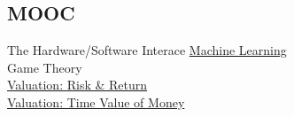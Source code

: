 \documentclass[]{deedy}
\begin{document}
\begin{minipage}[t]{0.25\textwidth}
\begin{flushleft}
\subsection{MOOC}
The Hardware/Software Interace
\vspace{1pt}
\href{https://www.coursera.org/account/accomplishments/certificate/7V2KZSKAL7ZJ}{Machine Learning} \\
\vspace{1pt}
Game Theory \\
\vspace{1pt}
\href{https://www.coursera.org/account/accomplishments/certificate/98ZD8GFQ8BMS}{Valuation: Risk \& Return} \\
\vspace{1pt}
\href{https://www.coursera.org/account/accomplishments/certificate/P637RR9C8B7T}{Valuation: Time Value of Money}
\sectionsep
%
\end{flushleft}
\end{minipage}
\hfill
%
\end{document}
